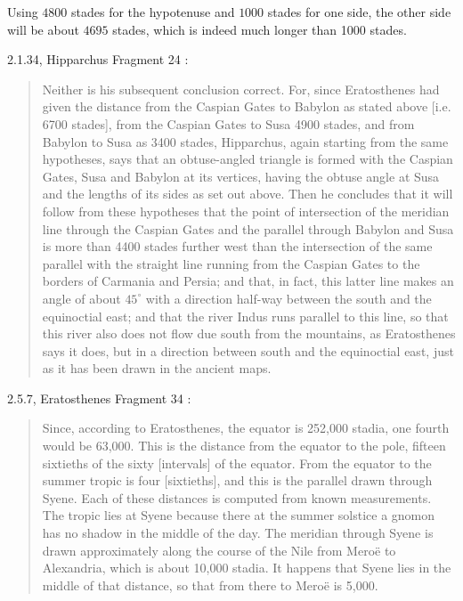 \documentclass{amsart}
\theoremstyle{definition}
\begin{document}
Using $4800$ stades for the hypotenuse and $1000$ stades for one side,
the other side will be about $4695$ stades, which is indeed much longer than 1000 stades.

2.1.34, Hipparchus Fragment 24 \cite[p.~77]{dicks}:

\begin{quote}
Neither is his subsequent conclusion correct. For, since Eratosthenes
had given the distance from the Caspian Gates to
Babylon as stated above [i.e. 6700 stades], from the Caspian
Gates to Susa 4900 stades, and from Babylon to Susa as
3400 stades, Hipparchus, again starting from the same
hypotheses, says that an obtuse-angled triangle is formed with the 
Caspian Gates, Susa and Babylon at its vertices, having the
obtuse angle at Susa and the lengths of its sides as set out above.
Then he concludes that it will follow from these hypotheses
that the point of intersection of the meridian line through the
Caspian Gates and the parallel through Babylon and Susa is
more than 4400 stades further west than the intersection of
the same parallel with the straight line running from the
Caspian Gates to the borders of Carmania and Persia; and
that, in fact, this latter line makes an angle of about $45^\circ$ with
a direction half-way between the south and the equinoctial
east; and that the river Indus runs parallel to this line, so that
this river also does not flow due south from the mountains, as
Eratosthenes says it does, but in a direction between south and
the equinoctial east, just as it has been drawn in the ancient
maps.
\end{quote}

2.5.7, Eratosthenes Fragment 34 \cite[p.~63]{eratosthenes}:

\begin{quote}
Since, according to Eratosthenes, the equator is 252,000
stadia, one fourth would be 63,000. This is the distance from the equator
to the pole, fifteen sixtieths of the sixty [intervals] of the equator.
From the equator to the summer tropic is four [sixtieths], and this is the
parallel drawn through Syene. Each of these distances is computed from
known measurements. The tropic lies at Syene because there at the
summer solstice a gnomon has no shadow in the middle of the day. The
meridian through Syene is drawn approximately along the course of
the Nile from Mero\"e to Alexandria, which is about 10,000 stadia. It happens
that Syene lies in the middle of that distance, so that from there to
Mero\"e is 5,000.
\end{quote}
\end{document}
